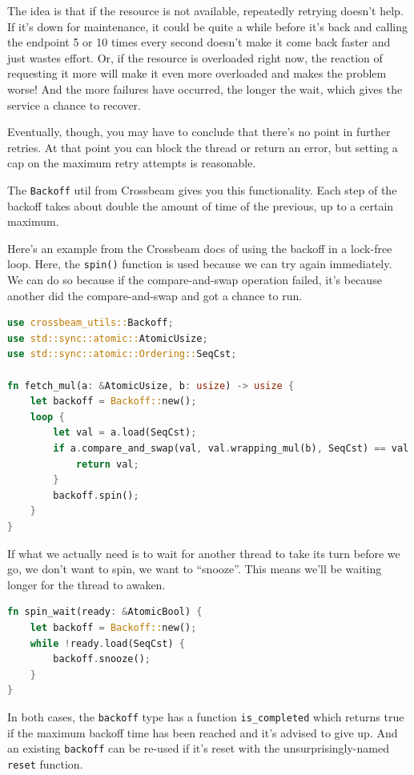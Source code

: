 \documentclass[a4paper]{report}
\begin{document}
The idea is that if the resource is not available, repeatedly retrying doesn't help. If it's down for maintenance, it could be quite a while before it's back and calling the endpoint 5 or 10 times every second doesn't make it come back faster and just wastes effort. Or, if the resource is overloaded right now, the reaction of requesting it more will make it even more overloaded and makes the problem worse! And the more failures have occurred, the longer the wait, which gives the service a chance to recover.

Eventually, though, you may have to conclude that there's no point in further retries. At that point you can block the thread or return an error, but setting a cap on the maximum retry attempts is reasonable.

The \texttt{Backoff} util from Crossbeam gives you this functionality. Each step of the backoff takes about double the amount of time of the previous, up to a certain maximum.

Here's an example from the Crossbeam docs of using the backoff in a lock-free loop. Here, the \texttt{spin()} function is used because we can try again immediately. We can do so because if the compare-and-swap operation failed, it's because another did the compare-and-swap and got a chance to run.
\begin{lstlisting}[language=Rust]
use crossbeam_utils::Backoff;
use std::sync::atomic::AtomicUsize;
use std::sync::atomic::Ordering::SeqCst;

fn fetch_mul(a: &AtomicUsize, b: usize) -> usize {
    let backoff = Backoff::new();
    loop {
        let val = a.load(SeqCst);
        if a.compare_and_swap(val, val.wrapping_mul(b), SeqCst) == val {
            return val;
        }
        backoff.spin();
    }
}
\end{lstlisting}

If what we actually need is to wait for another thread to take its turn before we go, we don't want to spin, we want to ``snooze''. This means we'll be waiting longer for the thread to awaken.

\begin{lstlisting}[language=Rust]
fn spin_wait(ready: &AtomicBool) {
    let backoff = Backoff::new();
    while !ready.load(SeqCst) {
        backoff.snooze();
    }
}
\end{lstlisting}

In both cases, the \texttt{backoff} type has a function \texttt{is\_completed} which returns true if the maximum backoff time has been reached and it's advised to give up. And an existing \texttt{backoff} can be re-used if it's reset with the unsurprisingly-named \texttt{reset} function.
\end{document}
